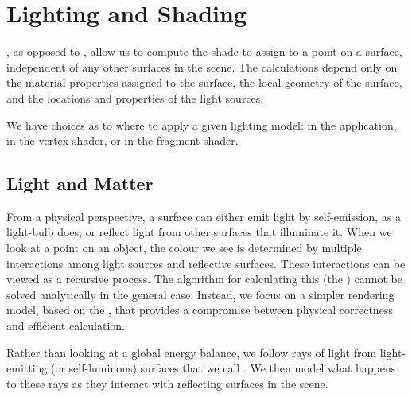 \documentclass[../COS3712_Notes.tex]{subfiles}
\begin{document}
  \setcounter{chapter}{5}
  \chapter{Lighting and Shading}
    , as opposed to ,
    allow us to compute the shade to assign to a point on a surface,
    independent of any other surfaces in the scene.
    The calculations depend only on the material properties assigned to the surface,
    the local geometry of the surface, and the locations and properties of the light sources.

    We have choices as to where to apply a given lighting model:
    in the application, in the vertex shader, or in the fragment shader.

    \section{Light and Matter}
      From a physical perspective, a surface can either emit light by self-emission,
      as a light-bulb does,
      or reflect light from other surfaces that illuminate it.
      When we look at a point on an object, the colour we see is determined by multiple
      interactions among light sources and reflective surfaces.
      These interactions can be viewed as a recursive process.
      The algorithm for calculating this (the ) cannot be solved
      analytically in the general case.
      Instead, we focus on a simpler rendering model, based on the ,
      that provides a compromise between physical correctness and efficient calculation.

      Rather than looking at a global energy balance, we follow rays of light
      from light-emitting (or self-luminous) surfaces that we call .
      We then model what happens to these rays as they interact with reflecting surfaces
      in the scene.
\end{document}

